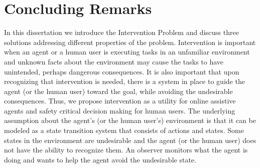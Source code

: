 \chapter{Concluding Remarks}
In this dissertation we introduce the Intervention Problem and discuss three solutions addressing different properties of the problem.
Intervention is important when an agent or a human user is executing tasks in an unfamiliar environment and unknown facts about the environment may cause the tasks to have unintended, perhaps dangerous consequences.
It is also important that upon recognizing that intervention is needed, there is a system in place to guide the agent (or the human user) toward the goal, while avoiding the undesirable consequences.
Thus, we propose intervention as a utility for online assistive agents and safety critical decision making for human users.
The underlying assumption about the agent's (or the human user's) environment is that it can be modeled as a state transition system that consists of actions and states.
Some states in the environment are undesirable and the agent (or the human user) does not have the ability to recognize them.
An observer monitors what the agent is doing and wants to help the agent avoid the undesirable state.

